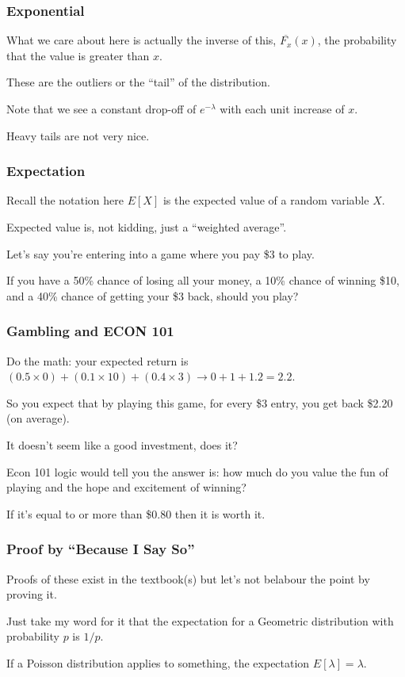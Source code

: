 \begin{frame}
\frametitle{Exponential}

What we care about here is actually the inverse of this, $\overline{F_{x}}(x)$, the probability that the value is greater than $x$.

These are the outliers or the ``tail'' of the distribution. 

Note that we see a constant drop-off of $e^{-\lambda}$ with each unit increase of $x$. 

Heavy tails are not very nice. 

\end{frame}



\begin{frame}
\frametitle{Expectation}

Recall the notation here $E[X]$ is the expected value of a random variable $X$. 

Expected value is, not kidding, just a ``weighted average''. 

Let's say you're entering into a game where you pay \$3 to play. 

If you have a 50\% chance of losing all your money, a 10\% chance of winning \$10, and a 40\% chance of getting your \$3 back, should you play?

\end{frame}



\begin{frame}
\frametitle{Gambling and ECON 101}

Do the math: your expected return is $(0.5 \times 0) + (0.1 \times 10) + (0.4 \times 3) \rightarrow 0 + 1 + 1.2 = 2.2$. 

So you expect that by playing this game, for every \$3 entry, you get back \$2.20 (on average). 

It doesn't seem like a good investment, does it? 

Econ 101 logic would tell you the answer is: how much do you value the fun of playing and the hope and excitement of winning? 

If it's equal to or more than \$0.80 then it is worth it.

\end{frame}



\begin{frame}
\frametitle{Proof by ``Because I Say So''}

Proofs of these exist in the textbook(s) but let's not belabour the point by proving it. 

Just take my word for it that the expectation for a Geometric distribution with probability $p$ is $1/p$.

If a Poisson distribution applies to something, the expectation $E[\lambda] = \lambda$.


\end{frame}



